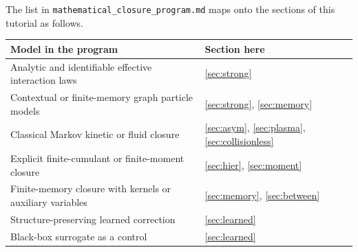 The list in \texttt{mathematical\_closure\_program.md} maps onto the
sections of this tutorial as follows.
\begin{center}
\renewcommand{\arraystretch}{1.2}
\begin{tabularx}{\textwidth}{@{}YP{4.6cm}@{}}
\toprule
Model in the program & Section here \\
\midrule
Analytic and identifiable effective interaction laws & \ref{sec:strong} \\
Contextual or finite-memory graph particle models
  & \ref{sec:strong}, \ref{sec:memory} \\
Classical Markov kinetic or fluid closure
  & \ref{sec:asym}, \ref{sec:plasma}, \ref{sec:collisionless} \\
Explicit finite-cumulant or finite-moment closure
  & \ref{sec:hier}, \ref{sec:moment} \\
Finite-memory closure with kernels or auxiliary variables
  & \ref{sec:memory}, \ref{sec:between} \\
Structure-preserving learned correction & \ref{sec:learned} \\
Black-box surrogate as a control & \ref{sec:learned} \\
\bottomrule
\end{tabularx}
\end{center}
